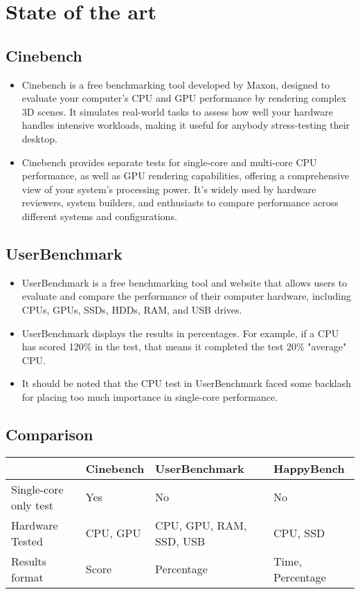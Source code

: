 \chapter{State of the art}

\section{Cinebench}

\begin{itemize}
  \item Cinebench is a free benchmarking tool developed by Maxon, designed to evaluate your computer's CPU and GPU performance by rendering complex 3D scenes. It simulates real-world tasks to assess how well your hardware handles intensive workloads, making it useful for anybody stress-testing their desktop.
  \item Cinebench provides separate tests for single-core and multi-core CPU performance, as well as GPU rendering capabilities, offering a comprehensive view of your system's processing power. It's widely used by hardware reviewers, system builders, and enthusiasts to compare performance across different systems and configurations.
\end{itemize}

\section{UserBenchmark}

\begin{itemize}
  \item UserBenchmark is a free benchmarking tool and website that allows users to evaluate and compare the performance of their computer hardware, including CPUs, GPUs, SSDs, HDDs, RAM, and USB drives.
  \item UserBenchmark displays the results in percentages. For example, if a CPU has scored 120\% in the test, that means it completed the test 20\% "average" CPU.
  \item It should be noted that the CPU test in UserBenchmark faced some backlash for placing too much importance in single-core performance.
\end{itemize}

\section{Comparison}
\begin{table}[ht]
\centering
\begin{tabular}{|l|l|l|l|}
\hline
                      & \textbf{Cinebench}  & \textbf{UserBenchmark} & \textbf{HappyBench}  \\ \hline
Single-core only test & Yes                 & No                     & No                      \\ \hline
Hardware Tested       & CPU, GPU            & CPU, GPU, RAM, SSD, USB& CPU, SSD             \\ \hline
Results format        & Score               & Percentage             & Time, Percentage \\
\hline
\end{tabular}
\label{example-table}
\end{table}


